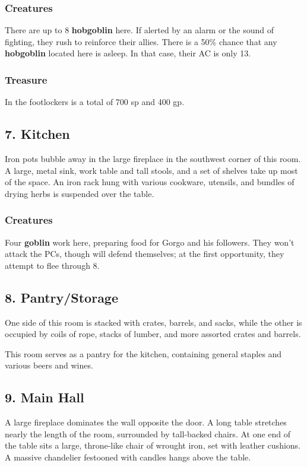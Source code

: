\documentclass[10pt,a4paper,twoside,bg=print,twocolumn,openany,nodeprecatedcode]{dndbook}
\begin{document}
\subsubsection{Creatures}
There are up to 8 \textbf{hobgoblin} here. If alerted by an alarm or the sound of fighting, they rush to reinforce their allies. There is a 50\% chance that any \textbf{hobgoblin} located here is asleep. In that case, their AC is only 13.

\subsubsection{Treasure}
In the footlockers is a total of 700 sp and 400 gp.

\subsection{7. Kitchen}
\begin{DndReadAloud}{}
Iron pots bubble away in the large fireplace in the southwest corner of this room. A large, metal sink, work table and tall stools, and a set of shelves take up most of the space. An iron rack hung with various cookware, utensils, and bundles of drying herbs is suspended over the table.

\end{DndReadAloud}

\subsubsection{Creatures}
Four \textbf{goblin} work here, preparing food for Gorgo and his followers. They won't attack the PCs, though will defend themselves; at the first opportunity, they attempt to flee through 8.

\subsection{8. Pantry/Storage}
\begin{DndReadAloud}{}
One side of this room is stacked with crates, barrels, and sacks, while the other is occupied by coils of rope, stacks of lumber, and more assorted crates and barrels.

\end{DndReadAloud}

This room serves as a pantry for the kitchen, containing general staples and various beers and wines.

\subsection{9. Main Hall}
\begin{DndReadAloud}{}
A large fireplace dominates the wall opposite the door. A long table stretches nearly the length of the room, surrounded by tall-backed chairs. At one end of the table sits a large, throne-like chair of wrought iron, set with leather cushions. A massive chandelier festooned with candles hangs above the table.

\end{DndReadAloud}
\end{document}
